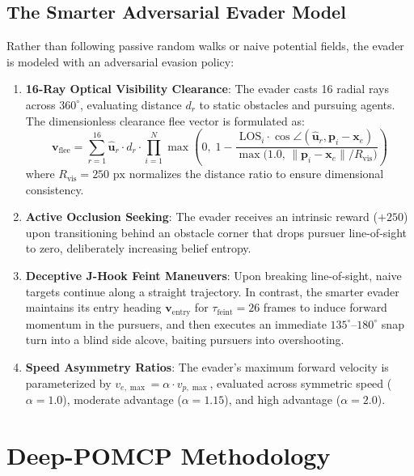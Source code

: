\documentclass[conference]{IEEEtran}
\begin{document}
\subsection{The Smarter Adversarial Evader Model}
Rather than following passive random walks or naive potential fields, the evader is modeled with an adversarial evasion policy:
\begin{enumerate}
    \item \textbf{16-Ray Optical Visibility Clearance}: The evader casts 16 radial rays across $360^\circ$, evaluating distance $d_r$ to static obstacles and pursuing agents. The dimensionless clearance flee vector is formulated as:
    \begin{equation}
        \mathbf{v}_{\text{flee}} = \sum_{r=1}^{16} \hat{\mathbf{u}}_r \cdot d_r \cdot \prod_{i=1}^N \max\left(0, \; 1 - \frac{\text{LOS}_i \cdot \cos\angle(\hat{\mathbf{u}}_r, \mathbf{p}_i - \mathbf{x}_e)}{\max\big(1.0, \, \|\mathbf{p}_i - \mathbf{x}_e\| / R_{\text{vis}}\big)}\right)
    \end{equation}
    where $R_{\text{vis}} = 250\text{ px}$ normalizes the distance ratio to ensure dimensional consistency.
    \item \textbf{Active Occlusion Seeking}: The evader receives an intrinsic reward ($+250$) upon transitioning behind an obstacle corner that drops pursuer line-of-sight to zero, deliberately increasing belief entropy.
    \item \textbf{Deceptive J-Hook Feint Maneuvers}: Upon breaking line-of-sight, naive targets continue along a straight trajectory. In contrast, the smarter evader maintains its entry heading $\mathbf{v}_{\text{entry}}$ for $\tau_{\text{feint}} = 26$ frames to induce forward momentum in the pursuers, and then executes an immediate $135^\circ$--$180^\circ$ snap turn into a blind side alcove, baiting pursuers into overshooting.
    \item \textbf{Speed Asymmetry Ratios}: The evader's maximum forward velocity is parameterized by $v_{e, \max} = \alpha \cdot v_{p, \max}$, evaluated across symmetric speed ($\alpha=1.0$), moderate advantage ($\alpha=1.15$), and high advantage ($\alpha=2.0$).
\end{enumerate}

\section{Deep-POMCP Methodology}
\end{document}
